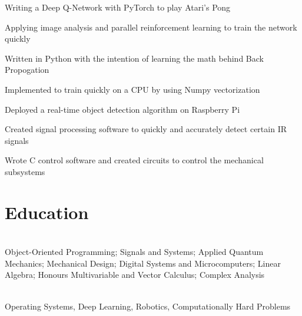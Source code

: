 \documentclass[]{deedy-resume-openfont}
\begin{document}
\begin{tightemize}
	\item Writing a Deep Q-Network with PyTorch to play Atari's Pong
	\item Applying image analysis and parallel reinforcement learning to train the network quickly
\end{tightemize}

\begin{tightemize}
	\item Written in Python with the intention of learning the math behind Back Propogation 
	\item Implemented to train quickly on a CPU by using Numpy vectorization
\end{tightemize}

\begin{tightemize}
	\item Deployed a real-time object detection algorithm on Raspberry Pi
	\item Created signal processing software to quickly and accurately detect certain IR signals
	\item Wrote C control software and created circuits to control the mechanical subsystems
\end{tightemize}

\vspace{12pt}


\section{Education}

\begin{adjustwidth}{0.55cm}{1.25cm}
	 \\
	 Object-Oriented Programming; Signals and Systems; Applied Quantum Mechanics; Mechanical Design; Digital Systems and Microcomputers; Linear Algebra; Honours Multivariable and Vector Calculus; Complex Analysis
\end{adjustwidth}
\vspace{8pt}

\begin{adjustwidth}{0.55cm}{1.25cm}
	 \\
	 Operating Systems, Deep Learning, Robotics, Computationally Hard Problems
\end{adjustwidth}
\end{document}
